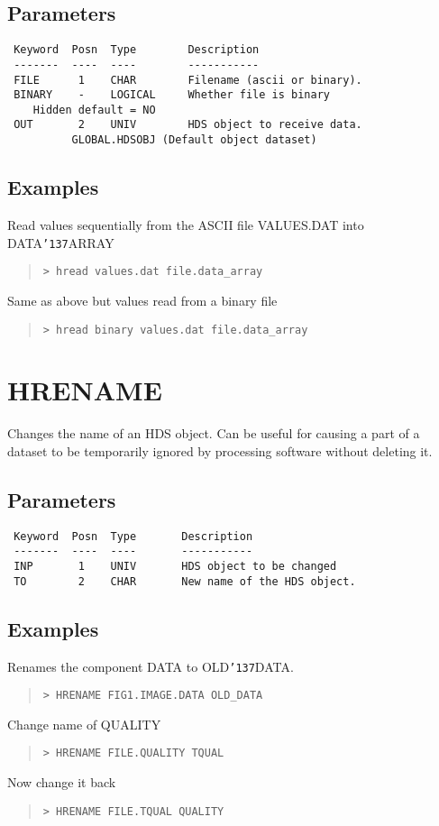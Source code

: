 \documentclass{book}
\renewcommand{\_}{{\tt\char'137}}     %
\begin{document}
\subsection{Parameters}
\begin{verbatim}
 Keyword  Posn  Type        Description
 -------  ----  ----        -----------
 FILE      1    CHAR        Filename (ascii or binary).
 BINARY    -    LOGICAL     Whether file is binary
    Hidden default = NO
 OUT       2    UNIV        HDS object to receive data.
          GLOBAL.HDSOBJ (Default object dataset)

\end{verbatim}\subsection{Examples}
Read values sequentially from the ASCII file VALUES.DAT into DATA\_ARRAY
\begin{quote}\begin{verbatim}
> hread values.dat file.data_array
\end{verbatim}\end{quote}
Same as above but values read from a binary file
\begin{quote}\begin{verbatim}
> hread binary values.dat file.data_array
\end{verbatim}\end{quote}
\section{HRENAME}
Changes the name of an HDS object. Can be useful for causing a
part of a dataset to be temporarily ignored by processing
software without deleting it.

\subsection{Parameters}
\begin{verbatim}
 Keyword  Posn  Type       Description
 -------  ----  ----       -----------
 INP       1    UNIV       HDS object to be changed
 TO        2    CHAR       New name of the HDS object.

\end{verbatim}\subsection{Examples}
Renames the component DATA to OLD\_DATA.
\begin{quote}\begin{verbatim}
> HRENAME FIG1.IMAGE.DATA OLD_DATA
\end{verbatim}\end{quote}
Change name of QUALITY
\begin{quote}\begin{verbatim}
> HRENAME FILE.QUALITY TQUAL
\end{verbatim}\end{quote}
Now change it back
\begin{quote}\begin{verbatim}
> HRENAME FILE.TQUAL QUALITY
\end{verbatim}\end{quote}
\end{document}
